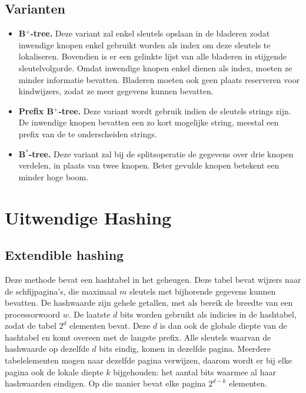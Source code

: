 \documentclass{report}
\begin{document}
	\subsection{Varianten}
	\begin{itemize}
		\item \textbf{B$^{+}$-tree.} Deze variant zal enkel sleutels opslaan in de bladeren zodat inwendige knopen enkel gebruikt worden als index om deze sleutels te lokaliseren. Bovendien is er een gelinkte lijst van alle bladeren in stijgende sleutelvolgorde. Omdat inwendige knopen enkel dienen als index, moeten ze minder informatie bevatten. Bladeren moeten ook geen plaats reserveren voor kindwijzers, zodat ze meer gegevens kunnen bevatten.
		\item \textbf{Prefix B$^+$-tree.} Deze variant wordt gebruik indien de sleutels strings zijn. De inwendige knopen bevatten een zo kort mogelijke string, meestal een prefix van de te onderscheiden strings.
		\item \textbf{B$^*$-tree.} Deze variant zal bij de splitsoperatie de gegevens over drie knopen verdelen, in plaats van twee knopen. Beter gevulde knopen betekent een minder hoge boom.
	\end{itemize}
\section{Uitwendige Hashing}
\subsection{Extendible hashing}
Deze methode bevat een hashtabel in het geheugen. Deze tabel bevat wijzers naar de schfijpagina's, die maximaal $m$ sleutels met bijhorende gegevens kunnen bevatten. De hashwaarde zijn gehele getallen, met als bereik de breedte van een processorwoord $w$. De laatste $d$ bits worden gebruikt als indicies in de hashtabel, zodat de tabel $2^d$ elementen bevat. Deze $d$ is dan ook de globale diepte van de hashtabel en komt overeen met de langste prefix. Alle sleutels waarvan de hashwaarde op dezelfde $d$ bits eindig, komen in dezelfde pagina. Meerdere tabelelementen mogen naar dezelfde pagina verwijzen, daarom wordt er bij elke pagina ook de lokale diepte $k$ bijgehouden: het aantal bits waarmee al haar hashwaarden eindigen. Op die manier bevat elke pagina $2^{d - k}$ elementen.
\end{document}
